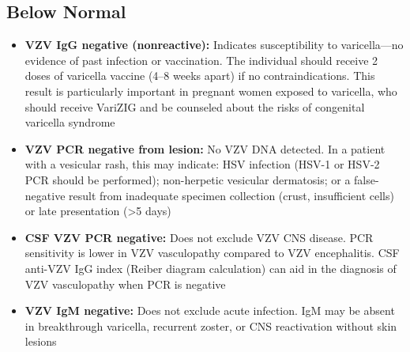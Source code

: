 \subsection*{Below Normal}
\begin{itemize}
  \item \textbf{VZV IgG negative (nonreactive):} Indicates susceptibility to varicella---no evidence of past infection or vaccination. The individual should receive 2 doses of varicella vaccine (4--8 weeks apart) if no contraindications. This result is particularly important in pregnant women exposed to varicella, who should receive VariZIG and be counseled about the risks of congenital varicella syndrome
  \item \textbf{VZV PCR negative from lesion:} No VZV DNA detected. In a patient with a vesicular rash, this may indicate: HSV infection (HSV-1 or HSV-2 PCR should be performed); non-herpetic vesicular dermatosis; or a false-negative result from inadequate specimen collection (crust, insufficient cells) or late presentation (>5 days)
  \item \textbf{CSF VZV PCR negative:} Does not exclude VZV CNS disease. PCR sensitivity is lower in VZV vasculopathy compared to VZV encephalitis. CSF anti-VZV IgG index (Reiber diagram calculation) can aid in the diagnosis of VZV vasculopathy when PCR is negative
  \item \textbf{VZV IgM negative:} Does not exclude acute infection. IgM may be absent in breakthrough varicella, recurrent zoster, or CNS reactivation without skin lesions
\end{itemize}

